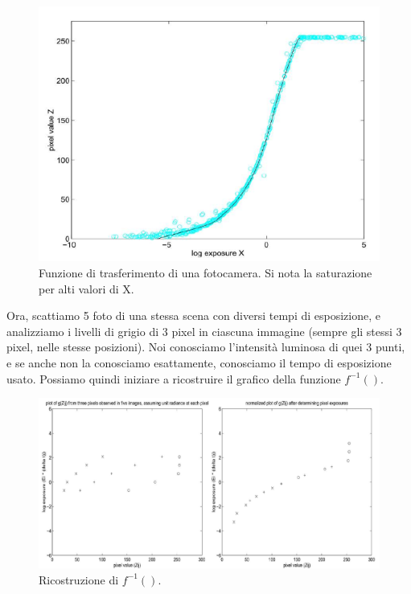 \documentclass[a4paper,11pt]{article}
\begin{document}
\renewcommand{\thefigure}{3.17}
\begin{figure}[!h]
  \centering
    \includegraphics[scale=0.6]{images/3/sensor_transfer_function.png}
    \caption{Funzione di trasferimento di una fotocamera. Si nota la saturazione per alti valori di X.}
\end{figure}

Ora, scattiamo 5 foto di una stessa scena con diversi tempi di esposizione, e analizziamo i livelli di grigio
di 3 pixel in ciascuna immagine (sempre gli stessi 3 pixel, nelle stesse posizioni). Noi conosciamo l'intensità luminosa di quei 3 punti,
e se anche non la conosciamo esattamente, conosciamo il tempo di esposizione usato. Possiamo quindi iniziare a ricostruire il grafico della funzione $f^{-1}()$.

\renewcommand{\thefigure}{3.18}
\begin{figure}[!h]
  \centering
    \includegraphics[scale=0.4]{images/3/inverse.png}
    \caption{Ricostruzione di $f^{-1}()$.}
\end{figure}
\end{document}
